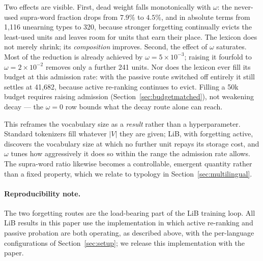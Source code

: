 Two effects are visible.
First, dead weight falls monotonically with $\omega$: the never-used supra-word
fraction drops from $7.9\%$ to $4.5\%$, and in absolute terms from 1{,}116
unearning types to 320, because stronger forgetting continually evicts the
least-used units and leaves room for units that earn their place. The lexicon
does not merely shrink; its \emph{composition} improves.
Second, the effect of $\omega$ saturates. Most of the reduction is already
achieved by $\omega=5\times10^{-3}$; raising it fourfold to
$\omega=2\times10^{-2}$ removes only a further 241 units. Nor does the lexicon
ever fill its budget at this admission rate: with the passive route switched
off entirely it still settles at 41{,}682, because active re-ranking continues
to evict. Filling a 50k budget requires raising admission
(Section~\ref{sec:budgetmatched}), not weakening decay — the $\omega=0$ row
bounds what the decay route alone can reach.

This reframes the vocabulary size as a \emph{result} rather than a
hyperparameter. Standard tokenizers fill whatever $|V|$ they are given; LiB, with
forgetting active, discovers the vocabulary size at which no further unit repays
its storage cost, and $\omega$ tunes how aggressively it does so within the
range the admission rate allows. The supra-word
ratio likewise becomes a controllable, emergent quantity rather than a fixed
property, which we relate to typology in Section~\ref{sec:multilingual}.

\paragraph{Reproducibility note.}
The two forgetting routes are the load-bearing part of the LiB training loop.
All LiB results in this paper use the implementation in which active
re-ranking and passive probation are both operating, as described above, with
the per-language configurations of Section~\ref{sec:setup}; we release this
implementation with the paper.
